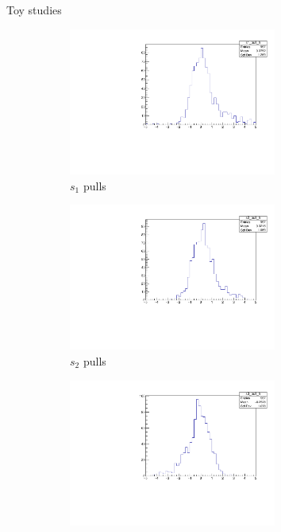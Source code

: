 \documentclass{beamer}
\begin{document}
\begin{frame}{Toy studies}
  \begin{figure}
    \centering
    \begin{subfigure}{0.5\textwidth}
      \centering
      \includegraphics[width=0.75\textwidth]{Plots/s1_ToyFits_pull.pdf}
      \caption{$s_1$ pulls}
    \end{subfigure}%
    \begin{subfigure}{0.5\textwidth}
      \centering
      \includegraphics[width=0.75\textwidth]{Plots/s2_ToyFits_pull.pdf}
      \caption{$s_2$ pulls}
    \end{subfigure}
    \begin{subfigure}{0.5\textwidth}
      \centering
      \includegraphics[width=0.75\textwidth]{Plots/s3_ToyFits_pull.pdf}

\end{subfigure}
\end{figure}
\end{frame}
\end{document}
